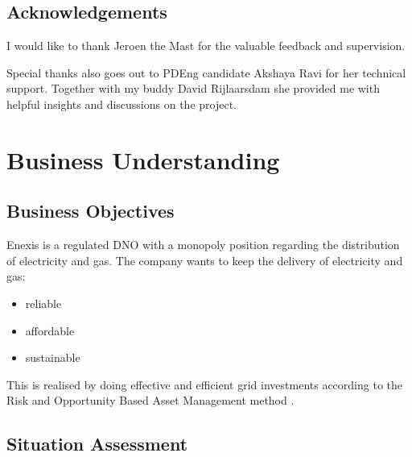 \documentclass[letterpaper,10pt,english]{sphinxmanual}
\begin{document}
\section{Acknowledgements}
\label{\detokenize{general:acknowledgements}}
\begin{DUlineblock}{0em}
\item[] I would like to thank Jeroen the Mast for the valuable feedback and supervision.
\item[] Special thanks also goes out to PDEng candidate Akshaya Ravi for her technical support. Together with my buddy David Rijlaarsdam she provided me with helpful insights and discussions on the project.
\end{DUlineblock}


\chapter{Business Understanding}
\label{\detokenize{business_understanding:business-understanding}}\label{\detokenize{business_understanding::doc}}

\section{Business Objectives}
\label{\detokenize{business_understanding:business-objectives}}
Enexis is a regulated DNO with a monopoly position regarding the distribution of electricity and gas.
The company wants to keep the delivery of electricity and gas:
\begin{itemize}
\item {} 
reliable

\item {} 
affordable

\item {} 
sustainable

\end{itemize}

This is realised by doing effective and efficient grid investments according to the Risk and Opportunity Based Asset Management method .


\section{Situation Assessment}
\label{\detokenize{business_understanding:situation-assessment}}
\end{document}
